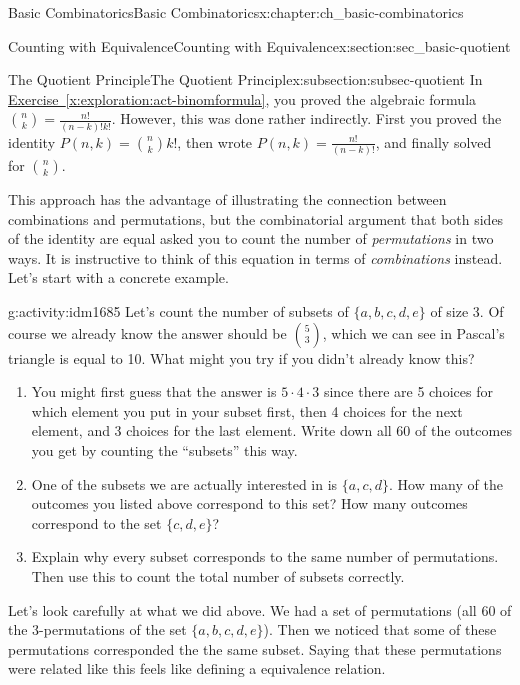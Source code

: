 \documentclass[oneside,10pt,]{book}
\numberwithin{equation}{chapter}
\begin{document}
\begin{chapterptx}{Basic Combinatorics}{}{Basic Combinatorics}{}{}{x:chapter:ch_basic-combinatorics}
\begin{sectionptx}{Counting with Equivalence}{}{Counting with Equivalence}{}{}{x:section:sec_basic-quotient}
\begin{introduction}{}
\end{introduction}%
%
%
\typeout{************************************************}
\typeout{************************************************}
%
\begin{subsectionptx}{The Quotient Principle}{}{The Quotient Principle}{}{}{x:subsection:subsec-quotient}
In \hyperref[x:exploration:act-binomformula]{Exercise~\ref{x:exploration:act-binomformula}}, you proved the algebraic formula \(\binom{n}{k} = \frac{n!}{(n-k)!k!}\).  However, this was done rather indirectly.  First you proved the identity \(P(n,k) = \binom{n}{k}k!\), then wrote \(P(n,k) = \frac{n!}{(n-k)!}\), and finally solved for \(\binom{n}{k}\).%
\par
This approach has the advantage of illustrating the connection between combinations and permutations, but the combinatorial argument that both sides of the identity are equal asked you to count the number of \emph{permutations} in two ways.  It is instructive to think of this equation in terms of \emph{combinations} instead.  Let's start with a concrete example.%
\begin{activity}{}{g:activity:idm1685}%
Let's count the number of subsets of \(\{a,b,c,d,e\}\) of size 3.  Of course we already know the answer should be \(\binom{5}{3}\), which we can see in Pascal's triangle is equal to 10.  What might you try if you didn't already know this?%
\begin{enumerate}[font=\bfseries,label=(\alph*),ref=\alph*]
\item{}You might first guess that the answer is \(5\cdot 4 \cdot 3\) since there are 5 choices for which element you put in your subset first, then  4 choices for the next element, and 3 choices for the last element.  Write down all 60 of the outcomes you get by counting the ``subsets'' this way.\footnotemark{}%
\item{}One of the subsets we are actually interested in is \(\{a,c,d\}\).  How many of the outcomes you listed above correspond to this set?  How many outcomes correspond to the set \(\{c,d,e\}\)?%
\item{}Explain why every subset corresponds to the same number of permutations.  Then use this to count the total number of subsets correctly.%
\end{enumerate}
\end{activity}
%
Let's look carefully at what we did above.  We had a set of permutations (all 60 of the 3-permutations of the set \(\{a,b,c,d,e\}\)).  Then we noticed that some of these permutations corresponded the the same subset.  Saying that these permutations were related like this feels like defining a equivalence relation.%

\end{subsectionptx}
\end{sectionptx}
\end{chapterptx}
\end{document}
